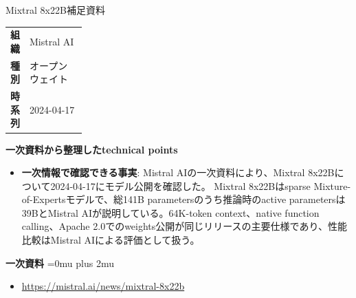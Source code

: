 \Needspace{0.38\textheight}
\begin{technicalnote}{Mixtral 8x22B}{補足資料}
\begingroup
\begin{tabularx}{\linewidth}{@{}>{\bfseries}p{0.22\linewidth}X@{}}
組織 & Mistral AI \\
種別 & オープンウェイト \\
時系列 & 2024-04-17 \\
\end{tabularx}
\smallskip
\begin{minipage}{\linewidth}
{\bfseries 一次資料から整理したtechnical points}
\begin{itemize}[leftmargin=1.5em,itemsep=0.35em]
\item \textbf{一次情報で確認できる事実}: Mistral AIの一次資料により、Mixtral 8x22Bについて2024-04-17にモデル公開を確認した。 Mixtral 8x22Bはsparse Mixture-of-Expertsモデルで、総141B parametersのうち推論時のactive parametersは39BとMistral AIが説明している。64K-token context、native function calling、Apache 2.0でのweights公開が同じリリースの主要仕様であり、性能比較はMistral AIによる評価として扱う。
\end{itemize}
\begin{minipage}{\linewidth}
\begin{samepage}
{\bfseries 一次資料}
\begingroup\sloppy
\Urlmuskip=0mu plus 2mu\relax
\begin{itemize}[leftmargin=1.5em,itemsep=0.25em]
\item {\scriptsize\url{https://mistral.ai/news/mixtral-8x22b}}
\end{itemize}
\endgroup
\end{samepage}
\end{minipage}
\end{minipage}
\endgroup
\end{technicalnote}
\medskip

